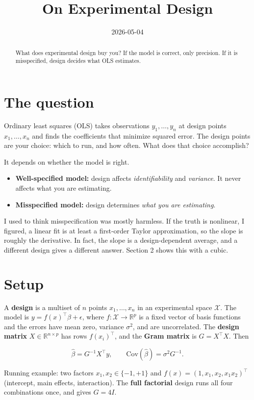 \documentclass{article}
\title{On Experimental Design}
\date{2026-05-04}
\begin{document}
\begin{abstract}
What does experimental design buy you? If the model is correct, only precision. If it is misspecified, design decides what OLS estimates.
\end{abstract}

\section{The question}

Ordinary least squares (OLS) takes observations $y_1, \dots, y_n$ at design points $x_1, \dots, x_n$ and finds the coefficients that minimize squared error. The design points are your choice: which to run, and how often. What does that choice accomplish?

It depends on whether the model is right.

\begin{itemize}
\item \textbf{Well-specified model:} design affects \emph{identifiability} and \emph{variance}. It never affects what you are estimating.
\item \textbf{Misspecified model:} design determines \emph{what you are estimating}.
\end{itemize}

I used to think misspecification was mostly harmless. If the truth is nonlinear, I figured, a linear fit is at least a first-order Taylor approximation, so the slope is roughly the derivative. In fact, the slope is a design-dependent average, and a different design gives a different answer. Section 2 shows this with a cubic.

\section{Setup}

A \textbf{design} is a multiset of $n$ points $x_1, \dots, x_n$ in an experimental space $\mathcal{X}$. The model is $y = f(x)^\top \beta + \epsilon$, where $f : \mathcal{X} \to \mathbb{R}^p$ is a fixed vector of basis functions and the errors have mean zero, variance $\sigma^2$, and are uncorrelated. The \textbf{design matrix} $X \in \mathbb{R}^{n \times p}$ has rows $f(x_i)^\top$, and the \textbf{Gram matrix} is $G = X^\top X$. Then

\[\hat\beta = G^{-1} X^\top y, \qquad \mathrm{Cov}(\hat\beta) = \sigma^2 G^{-1}.\]

Running example: two factors $x_1, x_2 \in \{-1, +1\}$ and $f(x) = (1, x_1, x_2, x_1 x_2)^\top$ (intercept, main effects, interaction). The \textbf{full factorial} design runs all four combinations once, and gives $G = 4I$.
\end{document}
